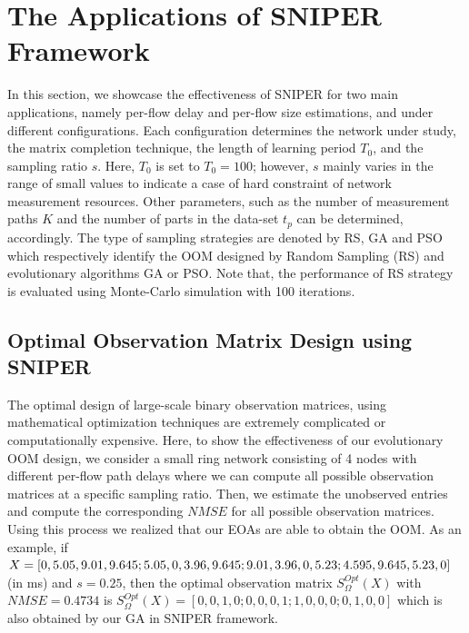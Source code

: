 \section{The Applications of SNIPER Framework} \label{sec:SNIPERResults}
In this section, we showcase the effectiveness of SNIPER for two main applications, namely per-flow delay and per-flow size estimations, and under different configurations. Each configuration determines the network under study, the matrix completion technique, the length of learning period $T_{0}$, and the sampling ratio $s$. Here, $T_{0}$ is set to $T_{0}=100$; however, $s$ mainly varies in the range of small values to indicate a case of hard constraint of network measurement resources. Other parameters, such as the number of measurement paths $K$ and the number of parts in the data-set $t_{p}$ can be determined, accordingly. The type of sampling strategies are denoted by RS, GA and PSO which respectively identify the OOM designed by Random Sampling (RS) and evolutionary algorithms GA or PSO. Note that, the performance of RS strategy is evaluated using Monte-Carlo simulation with 100 iterations.

\subsection{Optimal Observation Matrix Design using SNIPER}
The optimal design of large-scale binary observation matrices, using mathematical optimization techniques are extremely complicated or computationally expensive. Here, to show the effectiveness of our evolutionary OOM design, we consider a small ring network consisting of 4 nodes with different per-flow path delays where we can compute all possible observation matrices at a specific sampling ratio. Then, we estimate the unobserved entries and compute the corresponding $NMSE$ for all possible observation matrices. Using this process we realized that our EOAs are able to obtain the OOM. As an example, if $X=[0,5.05,9.01,9.645;5.05,0,3.96,9.645;9.01,3.96,0,5.23; \\ 4.595,9.645,5.23,0]$ (in ms) and $s=0.25$, then the optimal observation matrix $S_{\Omega}^{Opt}(X)$ with $NMSE=0.4734$ is $S_{\Omega}^{Opt}(X)=[0,0,1,0;0,0,0,1;1,0,0,0;0,1,0,0]$ which is also obtained by our GA in SNIPER framework.
%

